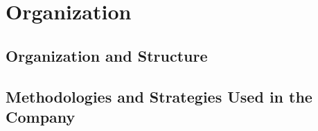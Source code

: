 \chapter{Organization}
\section{Organization and Structure}
\section{Methodologies and Strategies Used in the Company}